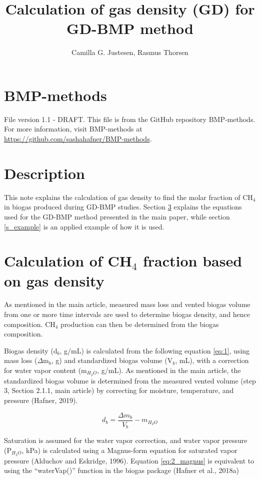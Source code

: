 \documentclass[]{article}
\title {Calculation of gas density (GD) for GD-BMP method}
\author{Camilla G. Justesen, Rasmus Thorsen}
\begin{document}
\maketitle

\section{BMP-methods}
File version 1.1 - DRAFT. 
\vspace{0.5cm} \newline 
This file is from the GitHub repository BMP-methods.
For more information, visit BMP-methods at \url{https://github.com/sashahafner/BMP-methods}.

\section{Description}
This note explains the calculation of gas density to find the molar fraction of CH$_4$ in biogas produced during GD-BMP studies. Section \ref{s_equations} explains the equations used for the GD-BMP method presented in the main paper, while section \ref{s_example} is an applied example of how it is used.

\section{Calculation of CH$_4$ fraction based on gas density} \label{s_equations}
As mentioned in the main article, measured mass loss and vented biogas volume from one or more time intervals are used to determine biogas density, and hence composition. CH$_4$ production can then be determined from the biogas composition.

Biogas density (d$_b$, g/mL) is calculated from the following equation \ref{eq:1}, using  mass loss ($\Delta$m$_b$, g) and standardized biogas volume (V$_b$, mL), with a correction for water vapor content (m$_{H_2O}$, g/mL). As mentioned in the main article, the standardized biogas volume is determined from the measured vented volume (step 3, Section 2.1.1, main article) by correcting for moisture, temperature, and pressure (Hafner, 2019).

\begin{equation}
  \label{eq:1}
  d_b=\frac{\Delta m_b}{V_b}-m_{H_2O}
\end{equation}

\noindent Saturation is assumed for the water vapor correction, and water vapor pressure (P$_{H_2O}$, kPa) is calculated using a Magnus-form equation for saturated vapor pressure (Alduchov and Eskridge, 1996). Equation \ref{eq:2_magnus} is equivalent to using the “waterVap()” function in the biogas package (Hafner et al., 2018a)
\end{document}
